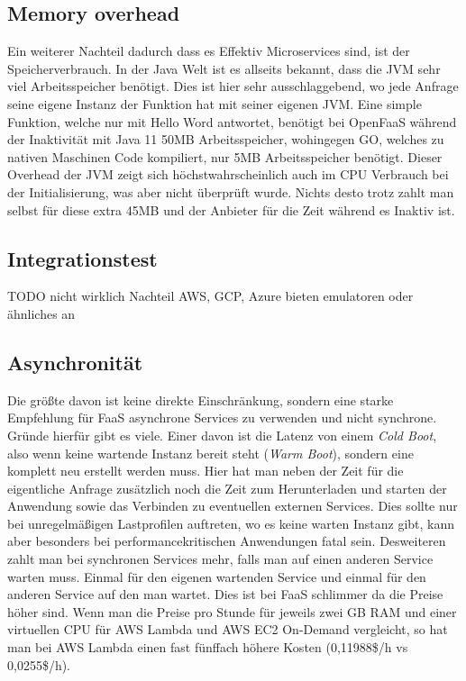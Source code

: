 \documentclass[12pt, a4paper]{article}
\begin{document}
\subsection{Memory overhead}
Ein weiterer Nachteil dadurch dass es Effektiv Microservices sind, ist der Speicherverbrauch.
In der Java Welt ist es allseits bekannt, dass die \ac{JVM} sehr viel Arbeitsspeicher benötigt.
Dies ist hier sehr ausschlaggebend, wo jede Anfrage seine eigene Instanz der Funktion hat mit seiner eigenen \ac{JVM}.
Eine simple Funktion, welche nur mit Hello Word antwortet, benötigt bei OpenFaaS während der Inaktivität mit Java 11 50MB Arbeitsspeicher, wohingegen GO, welches zu nativen Maschinen Code kompiliert, nur 5MB Arbeitsspeicher benötigt.
\newline
Dieser Overhead der JVM zeigt sich höchstwahrscheinlich auch im CPU Verbrauch bei der Initialisierung, was aber nicht überprüft wurde.
Nichts desto trotz zahlt man selbst für diese extra 45MB und der Anbieter für die Zeit während es Inaktiv ist.

\subsection{Integrationstest}
TODO
nicht wirklich Nachteil
AWS, GCP, Azure bieten emulatoren oder ähnliches an

\subsection{Asynchronität}
Die größte davon ist keine direkte Einschränkung, sondern eine starke Empfehlung für \ac{FaaS} asynchrone Services zu verwenden und nicht synchrone.
Gründe hierfür gibt es viele.
Einer davon ist die Latenz von einem \emph{Cold Boot}, also wenn keine wartende Instanz bereit steht (\emph{Warm Boot}), sondern eine komplett neu erstellt werden muss.
Hier hat man neben der Zeit für die eigentliche Anfrage zusätzlich noch die Zeit zum Herunterladen und starten der Anwendung sowie das Verbinden zu eventuellen externen Services.
Dies sollte nur bei unregelmäßigen Lastprofilen auftreten, wo es keine warten Instanz gibt, kann aber besonders bei performancekritischen Anwendungen fatal sein.
\newline
Desweiteren zahlt man bei synchronen Services mehr, falls man auf einen anderen Service warten muss.
Einmal für den eigenen wartenden Service und einmal für den anderen Service auf den man wartet.
Dies ist bei \ac{FaaS} schlimmer da die Preise höher sind.
Wenn man die Preise pro Stunde für jeweils zwei GB RAM und einer virtuellen CPU für AWS Lambda und AWS EC2 On-Demand vergleicht, so hat man bei AWS Lambda einen fast fünffach höhere Kosten (0,11988\$/h vs 0,0255\$/h).
\end{document}
